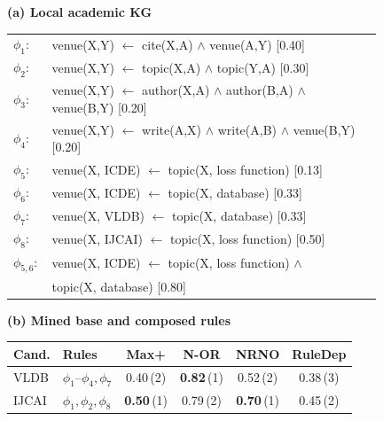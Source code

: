 \begin{figure}[t]
\centering
\hspace*{-0.015\textwidth}%
\begin{minipage}[c]{0.54\textwidth}
\centering
\resizebox{\linewidth}{!}{}
\vspace{-0.1cm}
\textbf{(a) Local academic KG}
\end{minipage}
\begin{minipage}[c]{0.46\textwidth}
\centering
{\magfigbodyfont
\setlength{\tabcolsep}{2pt}
\begin{tabular}{@{}>{\raggedleft\arraybackslash}p{0.08\linewidth}@{\;}p{0.90\linewidth}@{}}
\(\phi_1:\) & venue(X,Y) \(\leftarrow\) cite(X,A) \(\wedge\) venue(A,Y) [0.40] \\
\(\phi_2:\) & venue(X,Y) \(\leftarrow\) topic(X,A) \(\wedge\) topic(Y,A) [0.30] \\
\(\phi_3:\) & venue(X,Y) \(\leftarrow\) author(X,A) \(\wedge\) author(B,A) \(\wedge\) venue(B,Y) [0.20] \\
\(\phi_4:\) & venue(X,Y) \(\leftarrow\) write(A,X) \(\wedge\) write(A,B) \(\wedge\) venue(B,Y) [0.20] \\[4pt]
\(\phi_5:\) & venue(X, ICDE) \(\leftarrow\) topic(X, loss function) [0.13] \\
\(\phi_6:\) & venue(X, ICDE) \(\leftarrow\) topic(X, database) [0.33] \\
\(\phi_7:\) & venue(X, VLDB) \(\leftarrow\) topic(X, database) [0.33] \\
\(\phi_8:\) & venue(X, IJCAI) \(\leftarrow\) topic(X, loss function) [0.50] \\
\(\phi_{5,6}:\) & venue(X, ICDE) \(\leftarrow\) topic(X, loss function) \(\wedge\) \\
 & \quad\quad topic(X, database) [0.80]
\end{tabular}
\par
}
\vspace{2pt}
{\fontsize{9}{9.5}\selectfont\textbf{(b) Mined base and composed rules}}
\par
\vspace{8pt}
\fontsize{9}{9.5}\selectfont
\setlength{\tabcolsep}{5pt}
\begin{tabular}{@{}llcccc@{}}
\toprule
Cand. & Rules & Max+ & N-OR & NRNO & RuleDep \\
\midrule
VLDB & $\phi_1$--$\phi_4$,\,$\phi_7$ & 0.40\,(2) & \textbf{0.82}\,(1) & 0.52\,(2) & 0.38\,(3) \\
IJCAI & $\phi_1,\phi_2,\phi_8$ & \textbf{0.50}\,(1) & 0.79\,(2) & \textbf{0.70}\,(1) & 0.45\,(2) \\

\end{tabular}
\end{minipage}
\end{figure}
